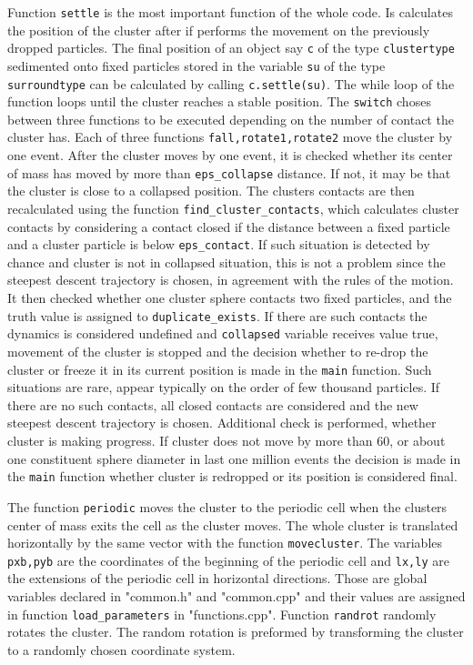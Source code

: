 \documentclass[12pt]{article}
\begin{document}
Function \texttt{settle} is the most important function of the whole code. Is calculates the position of the cluster after if performs the movement on the previously dropped particles. The final position of an object say \texttt{c} of the type \texttt{clustertype} sedimented onto fixed particles stored in the variable \texttt{su} of the type \texttt{surroundtype} can be calculated by calling \texttt{c.settle(su)}. The while loop of the function loops until the cluster reaches a stable position. The \texttt{switch} choses between three functions to be executed depending on the number of contact the cluster has. Each of three functions \texttt{fall,rotate1,rotate2} move the cluster by one event. After the cluster moves by one event, it is checked whether its center of mass has moved by more than \texttt{eps\_collapse} distance. If not, it may be that the cluster is close to a collapsed position. The clusters contacts are then recalculated using the function \texttt{find\_cluster\_contacts}, which calculates cluster contacts by considering a contact closed if the distance between a fixed particle and a cluster particle is below \texttt{eps\_contact}. If such situation is detected by chance and cluster is not in collapsed situation, this is not a problem since the steepest descent trajectory is chosen, in agreement with the rules of the motion. It then checked whether one cluster sphere contacts two fixed particles, and the truth value is assigned to \texttt{duplicate\_exists}. If there are such contacts the dynamics is considered undefined and \texttt{collapsed} variable receives value true, movement of the cluster is stopped and the decision whether to re-drop the cluster or freeze it in its current position is made in the \texttt{main} function. Such situations are rare, appear typically on the order of few thousand particles. If there are no such contacts, all closed contacts are considered and the new steepest descent trajectory is chosen. Additional check is performed, whether cluster is making progress. If cluster does not move by more than $60$, or about one constituent sphere diameter in last one million events the decision is made in the \texttt{main} function whether cluster is redropped or its position is considered final. 

The function \texttt{periodic} moves the cluster to the periodic cell when the clusters center of mass exits the cell as the cluster moves. The whole cluster is translated horizontally by the same vector with the function \texttt{movecluster}. The variables \texttt{pxb,pyb} are the coordinates of the beginning of the periodic cell and \texttt{lx,ly} are the extensions of the periodic cell in horizontal directions. Those are global variables declared in "common.h" and "common.cpp" and their values are assigned in function \texttt{load\_parameters} in "functions.cpp". Function \texttt{randrot} randomly rotates the cluster. The random rotation is preformed by transforming the cluster to a randomly chosen coordinate system.
\end{document}
